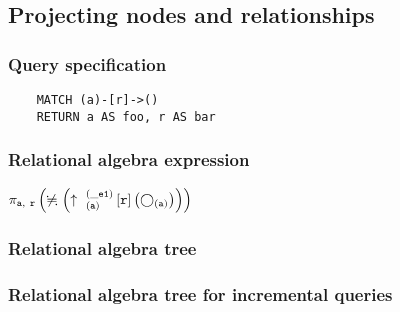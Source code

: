 	\subsection{Projecting nodes and relationships}

	\subsubsection*{Query specification}

	\begin{lstlisting}
	MATCH (a)-[r]->()
	RETURN a AS foo, r AS bar
	\end{lstlisting}


	\subsubsection*{Relational algebra expression}

	$\projection{\var{a},~\var{r}} \left(\alldifferent{} \left(\expandout{a}{\_e1}{}{r}{} \left(\getvertices{a}{}\right)\right)\right)$

	\subsubsection*{Relational algebra tree}


	\subsubsection*{Relational algebra tree for incremental queries}


